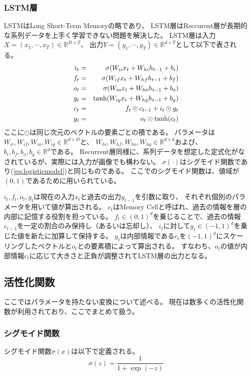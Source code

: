\subsubsection{LSTM層}
LSTMはLong Short-Term Memoryの略であり、
LSTM層はReccurent層が長期的な系列データを上手く学習できない問題を解決した。
LSTM層は入力\(X = (x_1,\cdots,x_T)\in \mathbb R^{D \times T}\)、
出力\(Y = (y_1,\cdots,y_T)\in \mathbb R^{d \times T}\)として以下で表される。
\begin{eqnarray}
    i_t &=& \sigma(W_{ii}x_t + W_{hi} h_{t-1} + b_i) \\
    f_t &=& \sigma(W_{if}x_t + W_{hf} h_{t-1} + b_f) \\
    o_t &=& \sigma(W_{io}x_t + W_{ho} h_{t-1} + b_o) \\
    g_t &=& {\rm tanh}(W_{ig}x_t + W_{hg} h_{t-1} + b_g) \\
    c_t &=& f_t \odot c_{t-1} + i_t \odot g_t \\
    y_t &=& o_t \odot {\rm tanh}(c_t)
    \label{eq:LSTM}
\end{eqnarray}
ここに\(\odot\)は同じ次元のベクトルの要素ごとの積である。
パラメータは\(W_{ii},W_{if},W_{io},W_{ig} \in \mathbb R^{d\times D}\)と、
\(W_{hi},W_{hf},W_{ho},W_{hg} \in \mathbb R^{d\times d}\)および、
\(b_{i},b_{f},b_{o},b_{g} \in \mathbb R^d\)である。
Recurrent層同様に、系列データを想定した定式化がなされているが、実際には入力が画像でも構わない。
\(\sigma(\cdot)\)はシグモイド関数であり(\ref{eq:logisticmodel})と同じものである。
ここでのシグモイド関数は、値域が\((0,1)\)であるために用いられている。

\(i_t,f_t,o_t,g_t\)は現在の入力\(x_t\)と過去の出力\(y_{t-1}\)を引数に取り、
それぞれ個別のパラメータを用いて値が算出される。
\(c_t\)はMemory Cellと呼ばれ、過去の情報を層の内部に記憶する役割を担っている。
\(f_t \in (0,1)^d \)を乗じることで、過去の情報\(c_{t-1}\)を一定の割合のみ保持し（あるいは忘却し）、
\(i_t\)に対して\(g_t \in (-1,1)^d\)を乗じた値を新たに加算して保持する。
\(y_t\)は内部情報である\(c_t\)を\((-1,1)^d\)にスケーリングしたベクトルと\(o_t\)との要素積によって算出される。
すなわち、\(o_t\)の値が内部情報\(c_t\)に応じて大きさと正負が調整されてLSTM層の出力となる。

\subsection{活性化関数}
ここではパラメータを持たない変換について述べる。
現在は数多くの活性化関数が利用されており、ここでまとめて扱う。
\subsubsection{シグモイド関数}
シグモイド関数\(\sigma(x)\)は以下で定義される。
\begin{equation}
    \sigma(z) = \frac{1}{1+\exp(-z)}
\end{equation}

